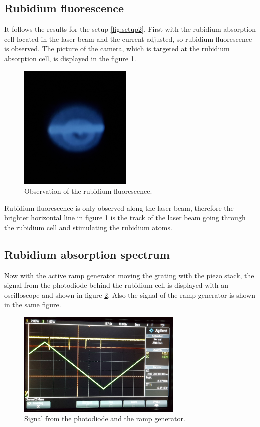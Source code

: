 \subsection{Rubidium fluorescence}
\label{subsec:RB_fluorescence}

It follows the results for the setup \ref{fig:setup2}.
First with the rubidium absorption cell located in the laser beam
and the current adjusted, so rubidium fluorescence is observed. The picture of the
camera, which is targeted at the
rubidium absorption cell, is
displayed in the figure \ref{fig:fluores}.

\begin{figure}
  \centering
  \includegraphics[height = 6cm]{figures/Rb_leuchten.jpg}
  \caption{Observation of the rubidium fluorescence.}
  \label{fig:fluores}
\end{figure}

Rubidium fluorescence is only observed along the laser beam, therefore
the brighter horizontal line
in figure \ref{fig:fluores}
is the track of the laser beam
going through the rubidium cell and stimulating the rubidium atoms.


\subsection{Rubidium absorption spectrum}
\label{subsec:Rubidium_absorptionspectrum}


Now with the active ramp generator moving the grating with the piezo stack,
the signal from the photodiode behind the rubidium cell
is displayed with an oscilloscope and shown in figure \ref{fig:ramp}.
Also the signal of the ramp generator is shown in the same
figure.

\FloatBarrier
\begin{figure}
  \centering
  \includegraphics[width = 0.7\textwidth]{figures/Ramp.jpg}
  \caption{Signal from the photodiode and the ramp generator.}
  \label{fig:ramp}
\end{figure}
\FloatBarrier

